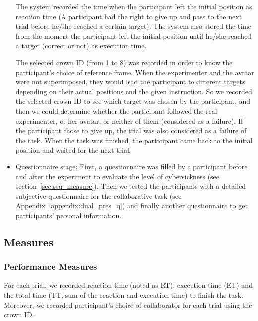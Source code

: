 \begin{itemize}
The system recorded the time when the participant left the initial position as reaction time (A participant had the right to give up and pass to the next trial before he/she reached a certain target). The system also stored the time from the moment the participant left the initial position until he/she reached a target (correct or not) as execution time.

The selected crown ID (from 1 to 8) was recorded in order to know the participant's choice of reference frame. When the experimenter and the avatar were not superimposed, they would lead the participant to different targets depending on their actual positions and the given instruction. So we recorded the selected crown ID to see which target was chosen by the participant, and then we could determine whether the participant followed the real experimenter, or her avatar, or neither of them (considered as a failure). If the participant chose to give up, the trial was also considered as a failure of the task. When the task was finished, the participant came back to the initial position and waited for the next trial.

\item Questionnaire stage: First, a questionnaire was filled by a participant before and after the experiment to evaluate the level of cybersickness (see section~\ref{sec:ssq_measure}). Then we tested the participants with a detailed subjective questionnaire for the collaborative task (see Appendix~\ref{appendix:dual_pres_q}) and finally another questionnaire to get participants' personal information.
\end{itemize}


\subsection{Measures}
\subsubsection{Performance Measures}
For each trial, we recorded reaction time (noted as RT), execution time (ET) and the total time (TT, sum of the reaction and execution time) to finish the task. Moreover, we recorded participant's choice of collaborator for each trial using the crown ID.

